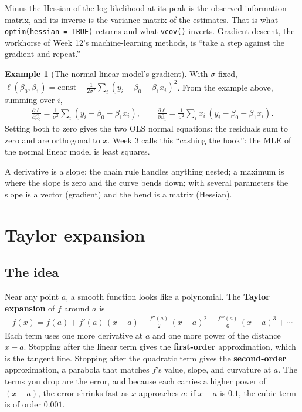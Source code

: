 \documentclass[11pt]{article}
\theoremstyle{definition}
\newtheorem{example}{Example}[section]
\newcommand{\loglik}{\ell}
\begin{document}
\begin{inthecourse}
Minus the Hessian of the log-likelihood at its peak is the observed
information matrix, and its inverse is the variance matrix of the
estimates. That is what \texttt{optim(hessian = TRUE)} returns and what
\texttt{vcov()} inverts. Gradient descent, the workhorse of Week 12's
machine-learning methods, is ``take a step against the gradient and
repeat.''
\end{inthecourse}

\begin{example}[The normal linear model's gradient]
With $\sigma$ fixed, $\loglik(\beta_0, \beta_1) = \text{const} -
\frac{1}{2\sigma^2}\sum_i (y_i - \beta_0 - \beta_1 x_i)^2$. From the
example above, summing over $i$,
\begin{align*}
  \frac{\partial\loglik}{\partial\beta_0} = \frac{1}{\sigma^2}\sum_i (y_i - \beta_0 - \beta_1 x_i),
  \qquad
  \frac{\partial\loglik}{\partial\beta_1} = \frac{1}{\sigma^2}\sum_i x_i\,(y_i - \beta_0 - \beta_1 x_i).
\end{align*}
Setting both to zero gives the two OLS normal equations: the residuals sum
to zero and are orthogonal to $x$. Week 3 calls this ``cashing the hook'':
the MLE of the normal linear model is least squares.
\end{example}

\begin{takeaway}
A derivative is a slope; the chain rule handles anything nested; a maximum
is where the slope is zero and the curve bends down; with several
parameters the slope is a vector (gradient) and the bend is a matrix
(Hessian).
\end{takeaway}

\section{Taylor expansion}
\label{sec:taylor}

\subsection{The idea}

Near any point $a$, a smooth function looks like a polynomial. The
\textbf{Taylor expansion} of $f$ around $a$ is
\begin{align*}
  f(x) = f(a) + f'(a)\,(x-a) + \frac{f''(a)}{2}\,(x-a)^2
  + \frac{f'''(a)}{6}\,(x-a)^3 + \cdots
\end{align*}
Each term uses one more derivative at $a$ and one more power of the
distance $x - a$. Stopping after the linear term gives the
\textbf{first-order} approximation, which is the tangent line. Stopping
after the quadratic term gives the \textbf{second-order} approximation, a
parabola that matches $f$'s value, slope, and curvature at $a$. The terms
you drop are the error, and because each carries a higher power of
$(x-a)$, the error shrinks fast as $x$ approaches $a$: if $x - a$ is
$0.1$, the cubic term is of order $0.001$.
\end{document}
